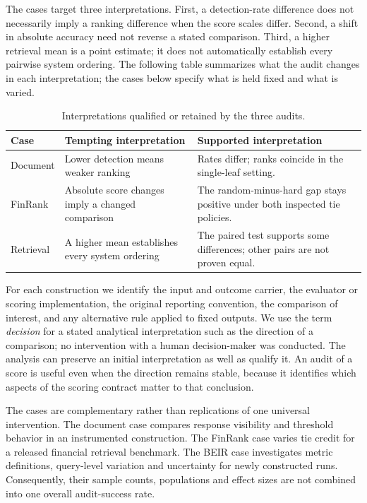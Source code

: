 \documentclass[runningheads]{llncs}
\begin{document}
The cases target three interpretations. First, a detection-rate
difference does not necessarily imply a ranking difference when the
score scales differ. Second, a shift in absolute accuracy need not
reverse a stated comparison. Third, a higher retrieval mean is a point
estimate; it does not automatically establish every pairwise system
ordering. The following table summarizes what the audit changes in each
interpretation; the cases below specify what is held fixed and what is
varied.

\begin{table}[htbp]
\caption{Interpretations qualified or retained by the three audits.}
\label{tab:interpretations}
\centering
\footnotesize
\renewcommand{\arraystretch}{1.12}
\begin{tabular}{@{}>{\raggedright\arraybackslash}p{}>{\raggedright\arraybackslash}p{}>{\raggedright\arraybackslash}p{}@{}}
\hline
Case & Tempting interpretation & Supported interpretation \\
\hline
Document & Lower detection means weaker ranking & Rates differ; ranks coincide in the single-leaf setting. \\
FinRank & Absolute score changes imply a changed comparison & The random-minus-hard gap stays positive under both inspected tie policies. \\
Retrieval & A higher mean establishes every system ordering & The paired test supports some differences; other pairs are not proven equal. \\
\hline
\end{tabular}
\end{table}

For each construction we identify the input and outcome carrier, the
evaluator or scoring implementation, the original reporting convention,
the comparison of interest, and any alternative rule applied to fixed
outputs. We use the term \emph{decision} for a stated analytical
interpretation such as the direction of a comparison; no intervention
with a human decision-maker was conducted. The analysis can preserve an
initial interpretation as well as qualify it. An audit of a score is
useful even when the direction remains stable, because it identifies
which aspects of the scoring contract matter to that conclusion.

The cases are complementary rather than replications of one universal
intervention. The document case compares response visibility and
threshold behavior in an instrumented construction. The FinRank case
varies tie credit for a released financial retrieval benchmark. The BEIR
case investigates metric definitions, query-level variation and
uncertainty for newly constructed runs. Consequently, their sample
counts, populations and effect sizes are not combined into one overall
audit-success rate.
\end{document}
